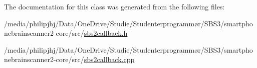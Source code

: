The documentation for this class was generated from the following files\-:\begin{DoxyCompactItemize}
\item 
/media/philipjhj/\-Data/\-One\-Drive/\-Studie/\-Studenterprogrammør/\-S\-B\-S3/smartphonebrainscanner2-\/core/src/\hyperlink{sbs2callback_8h}{sbs2callback.\-h}\item 
/media/philipjhj/\-Data/\-One\-Drive/\-Studie/\-Studenterprogrammør/\-S\-B\-S3/smartphonebrainscanner2-\/core/src/\hyperlink{sbs2callback_8cpp}{sbs2callback.\-cpp}\end{DoxyCompactItemize}

